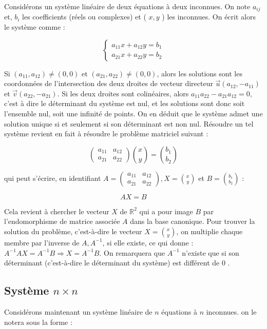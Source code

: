Considérons un système linéaire de deux équations à deux inconnues. On note $a_{i j}$ et, $b_i$ les coefficients (réels ou complexes) et ( $x, y$ ) les inconnues. On écrit alors le système comme :

$$
\left\{\begin{array}{l}
a_{11} x+a_{12} y=b_1 \\
a_{21} x+a_{22} y=b_2
\end{array}\right.
$$


Si $\left(a_{11}, a_{12}\right) \neq(0,0)$ et $\left(a_{21}, a_{22}\right) \neq(0,0)$, alors les solutions sont les coordonnées de l'intersection des deux droites de vecteur directeur $\vec{u}\left(a_{12},-a_{11}\right)$ et $\vec{v}\left(a_{22},-a_{21}\right)$. Si les deux droites sont colinéaires, alors $a_{11} a_{22}-a_{21} a_{12}=0$, c'est à dire le déterminant du système est nul, et les solutions sont donc soit l'ensemble nul, soit une infinité de points. On en déduit que le système admet une solution unique si et seulement si son déterminant est non nul. Résoudre un tel système revient en fait à résoudre le problème matriciel suivant :

$$
\left(\begin{array}{ll}
a_{11} & a_{12} \\
a_{21} & a_{22}
\end{array}\right)\binom{x}{y}=\binom{b_1}{b_2}
$$

qui peut s'écrire, en identifiant $A=\left(\begin{array}{ll}a_{11} & a_{12} \\ a_{21} & a_{22}\end{array}\right), X=\binom{x}{y}$ et $B=\binom{b_1}{b_2}$ :

$$
A X=B
$$


Cela revient à chercher le vecteur $X$ de $\mathbb{R}^2$ qui a pour image $B$ par l'endomorphisme de matrice associée $A$ dans la base canonique. Pour trouver la solution du problème, c'est-à-dire le vecteur $X=\binom{x}{y}$, on multiplie chaque membre par l'inverse de $A, A^{-1}$, si elle existe, ce qui donne : $A^{-1} A X=A^{-1} B \Longrightarrow X=A^{-1} B$. On remarquera que $A^{-1}$ n'existe que si son déterminant (c'est-à-dire le déterminant du système) est différent de 0 .

\subsection{Système $n \times n$}

Considérons maintenant un système linéaire de $n$ équations à $n$ inconnues. on le notera sous la forme :


